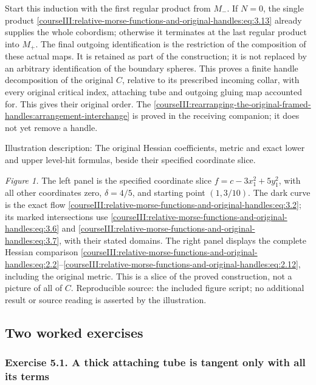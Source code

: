 Start this induction with the first regular product from \(M_-\). If \(N=0\), the single product \eqref{courseIII:relative-morse-functions-and-original-handles:eq:3.13} already supplies the whole cobordism; otherwise it terminates at the last regular product into \(M_+\). The final outgoing identification is the restriction of the composition of these actual maps. It is retained as part of the construction; it is not replaced by an arbitrary identification of the boundary spheres. This proves a finite handle decomposition of the original \(C\), relative to its prescribed incoming collar, with every original critical index, attaching tube and outgoing gluing map accounted for. This gives their original order. The \cref{courseIII:rearranging-the-original-framed-handles:arrangement-interchange} is proved in the receiving companion; it does not yet remove a handle.

Illustration description: The original Hessian coefficients, metric and exact lower and upper level-hit formulas, beside their specified coordinate slice.

\emph{Figure 1.} The left panel is the specified coordinate slice \(f=c-3x_1^2+5y_1^2\), with all other coordinates zero, \(\delta=4/5\), and starting point \((1,3/10)\). The dark curve is the exact flow \eqref{courseIII:relative-morse-functions-and-original-handles:eq:3.2}; its marked intersections use \eqref{courseIII:relative-morse-functions-and-original-handles:eq:3.6} and \eqref{courseIII:relative-morse-functions-and-original-handles:eq:3.7}, with their stated domains. The right panel displays the complete Hessian comparison \eqref{courseIII:relative-morse-functions-and-original-handles:eq:2.2}--\eqref{courseIII:relative-morse-functions-and-original-handles:eq:2.12}, including the original metric. This is a slice of the proved construction, not a picture of all of \(C\). Reproducible source: the included figure script; no additional result or source reading is asserted by the illustration.

\subsection{Two worked exercises}
\label{courseIII:relative-morse-functions-and-original-handles:relative-morse-exercises}

\label{courseIII:relative-morse-functions-and-original-handles:section-5}

\subsubsection{Exercise 5.1. A thick attaching tube is tangent only with all its terms}
\label{courseIII:relative-morse-functions-and-original-handles:exercise-5.1}

